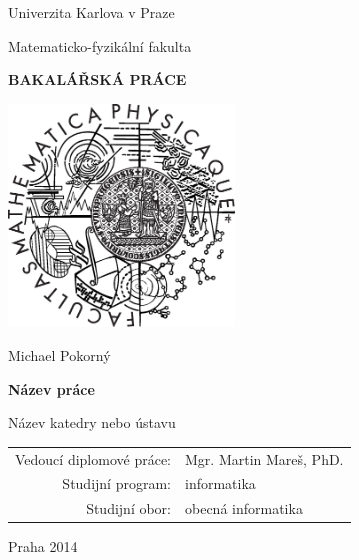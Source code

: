 \pagestyle{empty}
\begin{center}

\large

Univerzita Karlova v Praze

\medskip

Matematicko-fyzikální fakulta

\vfill

{\bf\Large BAKALÁŘSKÁ PRÁCE}

\vfill

\centerline{\mbox{\includegraphics[width=60mm]{img/logo.eps}}}

\vfill
\vspace{5mm}

{\LARGE Michael Pokorný}

\vspace{15mm}

{\LARGE\bfseries Název práce} %

\vfill

Název katedry nebo ústavu %

\vfill

\begin{tabular}{rl}

Vedoucí diplomové práce: & Mgr. Martin Mareš, PhD.\\
\noalign{\vspace{2mm}}
Studijní program: & informatika \\
\noalign{\vspace{2mm}}
Studijní obor: & obecná informatika \\
\end{tabular}

\vfill

Praha 2014

\end{center}
